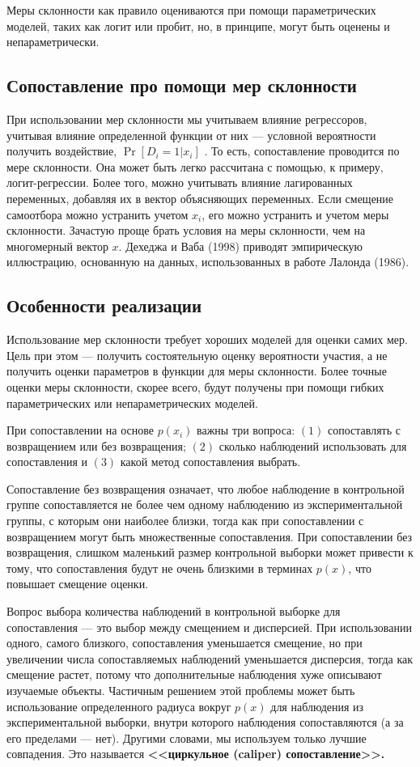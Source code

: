 Меры склонности как правило оцениваются при помощи параметрических моделей, таких как логит или пробит, но, в принципе, могут быть оценены и непараметрически. 

\subsection*{Сопоставление про помощи мер склонности}

При использовании мер склонности мы учитываем влияние регрессоров, учитывая влияние определенной функции от них --- условной вероятности получить воздействие, $\Pr [ D_i = 1 | x_i ]$ . То есть, сопоставление проводится по мере склонности. Она может быть легко рассчитана с помощью, к примеру, логит-регрессии. Более того, можно учитывать влияние лагированных переменных, добавляя их в вектор объясняющих переменных. Если смещение самоотбора можно устранить учетом $x_i$, его можно устранить и учетом меры склонности. Зачастую проще брать условия на меры склонности, чем на многомерный вектор $x$. Дехеджа и Ваба (1998) приводят эмпирическую иллюстрацию, основанную на данных, использованных в работе Лалонда (1986).

\subsection*{Особенности реализации}

Использование мер склонности требует хороших моделей для оценки самих мер. Цель при этом --- получить состоятельную оценку вероятности участия, а не получить оценки параметров в функции для меры склонности. Более точные оценки меры склонности, скорее всего, будут получены при помощи гибких параметрических или непараметрических моделей. 

При сопоставлении на основе $p(x_i)$ важны три вопроса: $(1)$ сопоставлять с возвращением или без возвращения; $(2)$ сколько наблюдений использовать для сопоставления и $(3)$ какой метод сопоставления выбрать. 

Сопоставление без возвращения означает, что любое наблюдение в контрольной группе сопоставляется не более чем одному наблюдению из экспериментальной группы, с которым они наиболее близки, тогда как при сопоставлении с возвращением могут быть множественные сопоставления. При сопоставлении без возвращения, слишком маленький размер контрольной выборки может привести к тому, что сопоставления будут не очень близкими в терминах $p(x)$, что повышает смещение оценки. 

Вопрос выбора количества наблюдений в контрольной выборке для сопоставления --- это выбор между смещением и дисперсией. При использовании одного, самого близкого, сопоставления уменьшается смещение, но при увеличении числа сопоставляемых наблюдений уменьшается дисперсия, тогда как смещение растет, потому что дополнительные наблюдения хуже описывают изучаемые объекты. Частичным решением этой проблемы может быть использование определенного радиуса вокруг $p(x)$ для наблюдения из экспериментальной выборки, внутри которого наблюдения сопоставляются (а за его пределами --- нет). Другими словами, мы используем только лучшие совпадения. Это называется \bfseries <<циркульное (caliper) сопоставление>>. \mdseries

